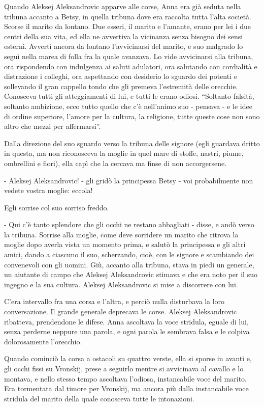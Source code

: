 Quando Aleksej Aleksandrovic apparve alle corse, Anna era già seduta nella tribuna accanto a Betsy, in quella tribuna dove era raccolta tutta l'alta società. Scorse il marito da lontano. Due esseri, il marito e l'amante, erano per lei i due centri della sua vita, ed ella ne avvertiva la vicinanza senza bisogno dei sensi esterni. Avvertì ancora da lontano l'avvicinarsi del marito, e suo malgrado lo seguì nella marea di folla fra la quale avanzava. Lo vide avvicinarsi alla tribuna, ora rispondendo con indulgenza ai saluti adulatori, ora salutando con cordialità e distrazione i colleghi, ora aspettando con desiderio lo sguardo dei potenti e sollevando il gran cappello tondo che gli premeva l'estremità delle orecchie. Conosceva tutti gli atteggiamenti di lui, e tutti le erano odiosi. ``Soltanto falsità, soltanto ambizione, ecco tutto quello che c'è nell'animo suo - pensava - e le idee di ordine superiore, l'amore per la cultura, la religione, tutte queste cose non sono altro che mezzi per affermarsi''. 

Dalla direzione del suo sguardo verso la tribuna delle signore (egli guardava dritto in questa, ma non riconosceva la moglie in quel mare di stoffe, nastri, piume, ombrellini e fiori), ella capì che la cercava ma finse di non accorgersene. 

- Aleksej Aleksandrovic! - gli gridò la principessa Betsy - voi probabilmente non vedete vostra moglie: eccola! 

Egli sorrise col suo sorriso freddo. 

- Qui c'è tanto splendore che gli occhi ne restano abbagliati - disse, e andò verso la tribuna. Sorrise alla moglie, come deve sorridere un marito che ritrova la moglie dopo averla vista un momento prima, e salutò la principessa e gli altri amici, dando a ciascuno il suo, scherzando, cioè, con le signore e scambiando dei convenevoli con gli uomini. Giù, accanto alla tribuna, stava in piedi un generale, un aiutante di campo che Aleksej Aleksandrovic stimava e che era noto per il suo ingegno e la sua cultura. Aleksej Aleksandrovic si mise a discorrere con lui. 

C'era intervallo fra una corsa e l'altra, e perciò nulla disturbava la loro conversazione. Il grande generale deprecava le corse. Aleksej Aleksandrovic ribatteva, prendendone le difese. Anna ascoltava la voce stridula, eguale di lui, senza perderne neppure una parola, e ogni parola le sembrava falsa e le colpiva dolorosamente l'orecchio. 

Quando cominciò la corsa a ostacoli su quattro verste, ella si sporse in avanti e, gli occhi fissi su Vronskij, prese a seguirlo mentre si avvicinava al cavallo e lo montava, e nello stesso tempo ascoltava l'odiosa, instancabile voce del marito. Era tormentata dal timore per Vronskij, ma ancora più dalla instancabile voce stridula del marito della quale conosceva tutte le intonazioni. 

